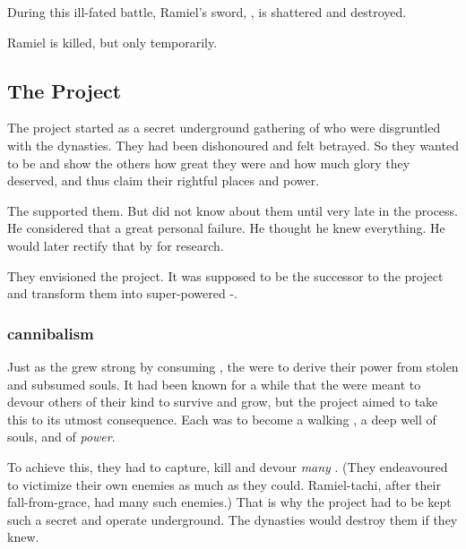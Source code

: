 During this ill-fated battle, Ramiel's sword, , is shattered and destroyed. 

Ramiel is killed, but only temporarily. 









\subsection{The \Malach{} Project}
The \Malach{} project started as a secret underground gathering of \resphain{} who were disgruntled with the dynasties. 
They had been dishonoured and felt betrayed. 
So they wanted to be \uber{} and show the others how great they were and how much glory they deserved, and thus claim their rightful places and power. 

The \banelords{} supported them. 
But \Azraid{} did not know about them until very late in the process. 
He considered that a great personal failure. 
He thought he knew everything. 
He would later rectify that by  for research. 

They envisioned the \Malach{} project. 
It was supposed to be the successor to the \sathariah{} project and transform them into super-powered \uber-\resphain. 





\subsubsection{\Malach{} cannibalism}
Just as the \satharioth{} grew strong by consuming \Nexagglachel, 
the \malachim{} were to derive their power from stolen and subsumed \resphan{} souls. 
It had been known for a while that the \resphain{} were meant to devour others of their kind to survive and grow, but the \malach{} project aimed to take this to its utmost consequence. 
Each \malach{} was to become a walking \carcer, a deep well of souls, and of \emph{power}. 

To achieve this, they had to capture, kill and devour \emph{many} \resphain{}.
(They endeavoured to victimize their own enemies as much as they could.
Ramiel-tachi, after their fall-from-grace, had many such enemies.)
That is why the project had to be kept such a secret and operate underground.  
The dynasties would destroy them if they knew. 





